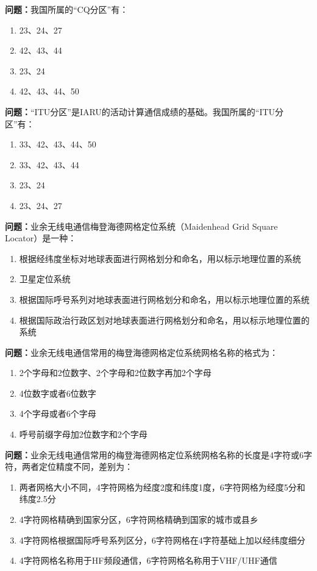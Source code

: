 \documentclass{ctexbook}
\begin{document}
\textbf{问题：}我国所属的“CQ分区”有：
\begin{enumerate}[label=\Alph*), leftmargin=3em]
\item 23、24、27
\item 42、43、44
\item 23、24
\item 42、43、44、50
\end{enumerate}

\textbf{问题：}“ITU分区”是IARU的活动计算通信成绩的基础。我国所属的“ITU分区”有：
\begin{enumerate}[label=\Alph*), leftmargin=3em]
\item 33、42、43、44、50
\item 33、42、43、44
\item 23、24
\item 23、24、27
\end{enumerate}

\textbf{问题：}业余无线电通信梅登海德网格定位系统（Maidenhead Grid Square Locator）是一种：
\begin{enumerate}[label=\Alph*), leftmargin=3em]
\item 根据经纬度坐标对地球表面进行网格划分和命名，用以标示地理位置的系统
\item 卫星定位系统
\item 根据国际呼号系列对地球表面进行网格划分和命名，用以标示地理位置的系统
\item 根据国际政治行政区划对地球表面进行网格划分和命名，用以标示地理位置的系统
\end{enumerate}

\textbf{问题：}业余无线电通信常用的梅登海德网格定位系统网格名称的格式为：
\begin{enumerate}[label=\Alph*), leftmargin=3em]
\item 2个字母和2位数字、2个字母和2位数字再加2个字母
\item 4位数字或者6位数字
\item 4个字母或者6个字母
\item 呼号前缀字母加2位数字和2个字母
\end{enumerate}

\textbf{问题：}业余无线电通信常用的梅登海德网格定位系统网格名称的长度是4字符或6字符，两者定位精度不同，差别为：
\begin{enumerate}[label=\Alph*), leftmargin=3em]
\item 两者网格大小不同，4字符网格为经度2度和纬度1度，6字符网格为经度5分和纬度2.5分
\item 4字符网格精确到国家分区，6字符网格精确到国家的城市或县乡
\item 4字符网格根据国际呼号系列区分，6字符网格在4字符基础上加以经纬度细分
\item 4字符网格名称用于HF频段通信，6字符网格名称用于VHF/UHF通信
\end{enumerate}
\end{document}
